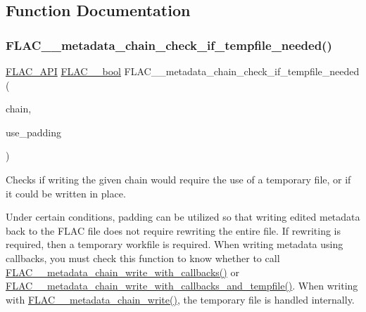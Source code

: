 \subsection{Function Documentation}
\mbox{\label{group__flac__metadata__level2_ga29a124cceaffce5376d073a032bd1c52}} 
\subsubsection{\texorpdfstring{F\+L\+A\+C\+\_\+\+\_\+metadata\+\_\+chain\+\_\+check\+\_\+if\+\_\+tempfile\+\_\+needed()}{FLAC\_\_metadata\_chain\_check\_if\_tempfile\_needed()}}
{\footnotesize\ttfamily \hyperlink{group__flac__export_ga56ca07df8a23310707732b1c0007d6f5}{F\+L\+A\+C\+\_\+\+A\+PI} \hyperlink{ordinals_8h_a95103469f1cbd78b8cf250194985b34e}{F\+L\+A\+C\+\_\+\+\_\+bool} F\+L\+A\+C\+\_\+\+\_\+metadata\+\_\+chain\+\_\+check\+\_\+if\+\_\+tempfile\+\_\+needed (\begin{DoxyParamCaption}\item[{\hyperlink{group__flac__metadata__level2_gaec6993c60b88f222a52af86f8f47bfdf}{F\+L\+A\+C\+\_\+\+\_\+\+Metadata\+\_\+\+Chain} $\ast$}]{chain,  }\item[{\hyperlink{ordinals_8h_a95103469f1cbd78b8cf250194985b34e}{F\+L\+A\+C\+\_\+\+\_\+bool}}]{use\+\_\+padding }\end{DoxyParamCaption})}

Checks if writing the given chain would require the use of a temporary file, or if it could be written in place.

Under certain conditions, padding can be utilized so that writing edited metadata back to the F\+L\+AC file does not require rewriting the entire file. If rewriting is required, then a temporary workfile is required. When writing metadata using callbacks, you must check this function to know whether to call \hyperlink{group__flac__metadata__level2_ga6bf7552940ec2242718d1ab164b89e03}{F\+L\+A\+C\+\_\+\+\_\+metadata\+\_\+chain\+\_\+write\+\_\+with\+\_\+callbacks()} or \hyperlink{group__flac__metadata__level2_ga371beab0d09d5248272bcb8d57de94f3}{F\+L\+A\+C\+\_\+\+\_\+metadata\+\_\+chain\+\_\+write\+\_\+with\+\_\+callbacks\+\_\+and\+\_\+tempfile()}. When writing with \hyperlink{group__flac__metadata__level2_gaa15ead7230217de8e79f4af822cda490}{F\+L\+A\+C\+\_\+\+\_\+metadata\+\_\+chain\+\_\+write()}, the temporary file is handled internally.


